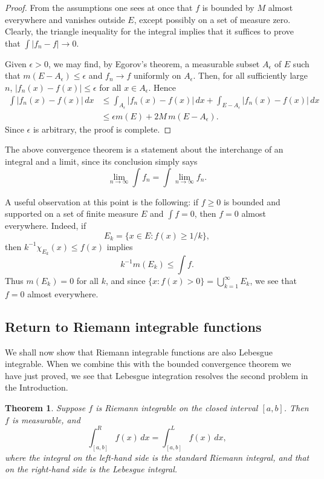 \documentclass[11pt,openany]{book}
\newtheorem{theorem}{Theorem}[section]
\begin{document}
\begin{proof}
From the assumptions one sees at once that $f$ is bounded by $M$ almost everywhere and vanishes outside $E$, except possibly on a set of measure zero. Clearly, the triangle inequality for the integral implies that it suffices to prove that $\int|f_n-f|\to0$.

Given $\epsilon>0$, we may find, by Egorov's theorem, a measurable subset $A_\epsilon$ of $E$ such that $m(E-A_\epsilon)\leq\epsilon$ and $f_n\to f$ uniformly on $A_\epsilon$. Then, for all sufficiently large $n$, $|f_n(x)-f(x)|\leq\epsilon$ for all $x\in A_\epsilon$. Hence
\begin{align*}
\int|f_n(x)-f(x)|\,dx
&\leq\int_{A_\epsilon}|f_n(x)-f(x)|\,dx
 +\int_{E-A_\epsilon}|f_n(x)-f(x)|\,dx\\
&\leq\epsilon m(E)+2M\,m(E-A_\epsilon).
\end{align*}
Since $\epsilon$ is arbitrary, the proof is complete.
\end{proof}

The above convergence theorem is a statement about the interchange of an integral and a limit, since its conclusion simply says
\[
\lim_{n\to\infty}\int f_n
=\int\lim_{n\to\infty}f_n.
\]

A useful observation at this point is the following: if $f\geq0$ is bounded and supported on a set of finite measure $E$ and $\int f=0$, then $f=0$ almost everywhere. Indeed, if
\[
E_k=\{x\in E:f(x)\geq1/k\},
\]
then $k^{-1}\chi_{E_k}(x)\leq f(x)$ implies
\[
k^{-1}m(E_k)\leq\int f.
\]
Thus $m(E_k)=0$ for all $k$, and since $\{x:f(x)>0\}=\bigcup_{k=1}^{\infty}E_k$, we see that $f=0$ almost everywhere.

\subsection*{Return to Riemann integrable functions}

We shall now show that Riemann integrable functions are also Lebesgue integrable. When we combine this with the bounded convergence theorem we have just proved, we see that Lebesgue integration resolves the second problem in the Introduction.

\begin{theorem}
Suppose $f$ is Riemann integrable on the closed interval $[a,b]$. Then $f$ is measurable, and
\[
\int_{[a,b]}^{R}f(x)\,dx
=\int_{[a,b]}^{L}f(x)\,dx,
\]
where the integral on the left-hand side is the standard Riemann integral, and that on the right-hand side is the Lebesgue integral.
\end{theorem}
\end{document}

